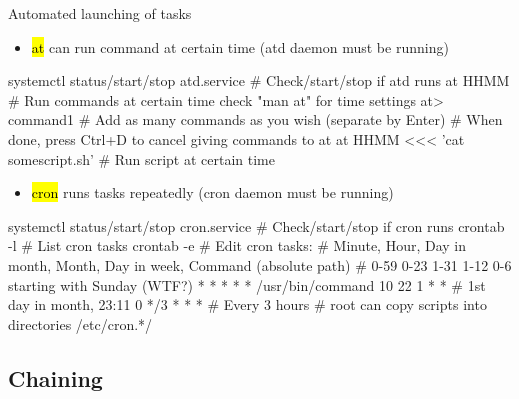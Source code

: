 \documentclass[compress, ucs, xelatex, 11pt, xcolor=svgnames,
  hyperref={
    bookmarks=true,
    unicode=true,
    colorlinks=true,
    pdftitle={Linux, command line and MetaCentrum},
    plainpages=false,
    pdfauthor={Vojtech Zeisek},
    pdfsubject={Course about use of Linux command line, writing shell scripts and using MetaCentrum of CESNET},
    pdfcreator={XeLaTeX},
    pdfkeywords={Linux, GNU, BASH, shell, command line, MetaCentrum},
    linkcolor=DarkRed,
    anchorcolor=DarkBlue,
    citecolor=Indigo,
    filecolor=NavyBlue,
    menucolor=DarkMagenta,
    urlcolor=DarkBlue,
    pdftex},
  url={hyphens, lowtilde} %
  ]{beamer}
\renewcommand{\texttt}[1]{\hl{\ttfamily #1}}
\begin{document}
\begin{frame}[fragile]{Automated launching of tasks}
\begin{itemize}
  \item \texttt{at} can run command at certain time (atd daemon must be running)
\end{itemize}
  \begin{bashcode}
    systemctl status/start/stop atd.service # Check/start/stop if atd runs
    at HHMM # Run commands at certain time check "man at" for time settings
    at> command1 # Add as many commands as you wish (separate by Enter)
    # When done, press Ctrl+D to cancel giving commands to at
    at HHMM <<< 'cat somescript.sh' # Run script at certain time
  \end{bashcode}
\begin{itemize}
  \item \texttt{cron} runs tasks repeatedly (cron daemon must be running)
\end{itemize}
  \begin{bashcode}
    systemctl status/start/stop cron.service # Check/start/stop if cron runs
    crontab -l # List cron tasks
    crontab -e # Edit cron tasks:
    # Minute, Hour, Day in month, Month, Day in week, Command (absolute path)
    # 0-59    0-23  1-31          1-12   0-6 starting with Sunday (WTF?)
      *       *     *             *      *            /usr/bin/command
      10      22    1             *      *        # 1st day in month, 23:11
      0       */3   *             *      *        # Every 3 hours
    # root can copy scripts into directories /etc/cron.*/
  \end{bashcode}
\end{frame}

\subsection{Chaining}
\end{document}
